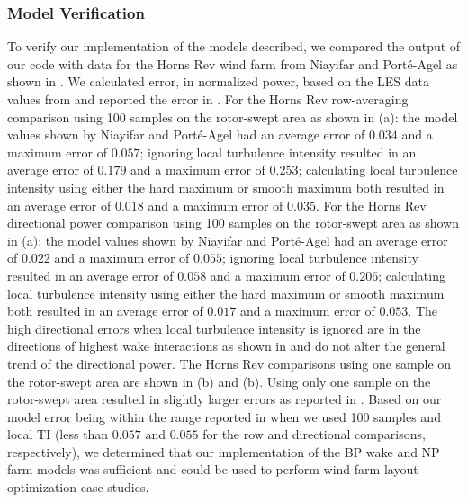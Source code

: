 \documentclass[conf]{new-aiaa}
\begin{document}
\subsubsection{Model Verification}
To verify our implementation of the models described, we compared the output of our code with data for the Horns Rev wind farm from Niayifar and Port\'{e}-Agel \cite{niayifar2016} as shown in . We calculated error, in normalized power, based on the LES data values from \cite{niayifar2016} and reported the error in . For the Horns Rev row-averaging comparison using 100 samples on the rotor-swept area as shown in (a): the model values shown by Niayifar and Port\'{e}-Agel had an average error of $0.034$ and a maximum error of $0.057$; ignoring local turbulence intensity resulted in an average error of $0.179$ and a maximum error of $0.253$; calculating local turbulence intensity using either the hard maximum or smooth maximum both resulted in an average error of $0.018$ and a maximum error of $0.035$.  For the Horns Rev directional power comparison using 100 samples on the rotor-swept area as shown in (a): the model values shown by Niayifar and Port\'{e}-Agel had an average error of $0.022$ and a maximum error of $0.055$; ignoring local turbulence intensity resulted in an average error of $0.058$ and a maximum error of $0.206$; calculating local turbulence intensity using either the hard maximum or smooth maximum both resulted in an average error of $0.017$ and a maximum error of $0.053$. The high directional errors when local turbulence intensity is ignored are in the directions of highest wake interactions as shown in  and do not alter the general trend of the directional power. The Horns Rev comparisons using one sample on the rotor-swept area are shown in (b) and (b). Using only one sample on the rotor-swept area resulted in slightly larger errors as reported in . Based on our model error being within the range reported in \cite{niayifar2016} when we used 100 samples and local TI (less than $0.057$ and $0.055$ for the row and directional comparisons, respectively), we determined that our implementation of the BP wake and NP farm models was sufficient and could be used to perform wind farm layout optimization case studies.
\end{document}
